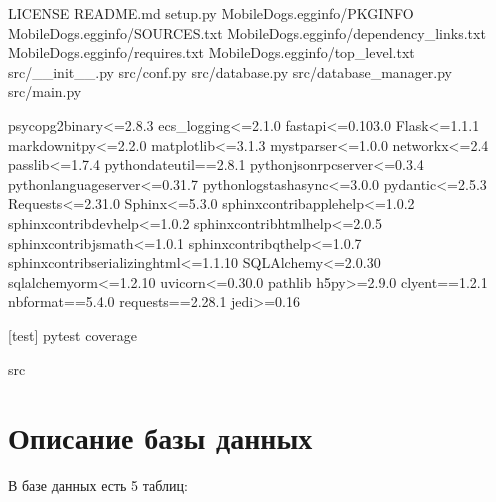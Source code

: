 \documentclass[letterpaper,10pt,russian]{sphinxmanual}
\begin{document}
\sphinxstepscope

\sphinxAtStartPar
LICENSE
README.md
setup.py
MobileDogs.egg\sphinxhyphen{}info/PKG\sphinxhyphen{}INFO
MobileDogs.egg\sphinxhyphen{}info/SOURCES.txt
MobileDogs.egg\sphinxhyphen{}info/dependency\_links.txt
MobileDogs.egg\sphinxhyphen{}info/requires.txt
MobileDogs.egg\sphinxhyphen{}info/top\_level.txt
src/\_\_init\_\_.py
src/conf.py
src/database.py
src/database\_manager.py
src/main.py

\sphinxstepscope

\sphinxstepscope

\sphinxAtStartPar
psycopg2\sphinxhyphen{}binary\textless{}=2.8.3
ecs\_logging\textless{}=2.1.0
fastapi\textless{}=0.103.0
Flask\textless{}=1.1.1
markdown\sphinxhyphen{}it\sphinxhyphen{}py\textless{}=2.2.0
matplotlib\textless{}=3.1.3
myst\sphinxhyphen{}parser\textless{}=1.0.0
networkx\textless{}=2.4
passlib\textless{}=1.7.4
python\sphinxhyphen{}dateutil==2.8.1
python\sphinxhyphen{}jsonrpc\sphinxhyphen{}server\textless{}=0.3.4
python\sphinxhyphen{}language\sphinxhyphen{}server\textless{}=0.31.7
python\sphinxhyphen{}logstash\sphinxhyphen{}async\textless{}=3.0.0
pydantic\textless{}=2.5.3
Requests\textless{}=2.31.0
Sphinx\textless{}=5.3.0
sphinxcontrib\sphinxhyphen{}applehelp\textless{}=1.0.2
sphinxcontrib\sphinxhyphen{}devhelp\textless{}=1.0.2
sphinxcontrib\sphinxhyphen{}htmlhelp\textless{}=2.0.5
sphinxcontrib\sphinxhyphen{}jsmath\textless{}=1.0.1
sphinxcontrib\sphinxhyphen{}qthelp\textless{}=1.0.7
sphinxcontrib\sphinxhyphen{}serializinghtml\textless{}=1.1.10
SQLAlchemy\textless{}=2.0.30
sqlalchemy\sphinxhyphen{}orm\textless{}=1.2.10
uvicorn\textless{}=0.30.0
pathlib
h5py\textgreater{}=2.9.0
clyent==1.2.1
nbformat==5.4.0
requests==2.28.1
jedi\textgreater{}=0.16

\sphinxAtStartPar
{[}test{]}
pytest
coverage

\sphinxstepscope

\sphinxAtStartPar
src

\sphinxstepscope


\chapter{Описание базы данных}
\label{\detokenize{src/database:id1}}\label{\detokenize{src/database::doc}}
\sphinxAtStartPar
В базе данных есть 5 таблиц:
\end{document}
